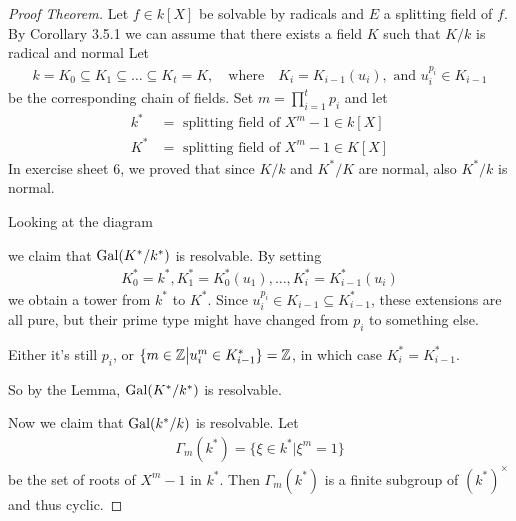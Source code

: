 \begin{proof}[Proof Theorem]
  Let $f \in k[X]$ be solvable by radicals and $E$ a splitting field of $f$.
  By Corollary 3.5.1 we can assume that there exists a field $K$ such that $K/k$ is radical and normal
  Let
  \begin{align*}
    k = K_0 \subseteq K_1 \subseteq \ldots \subseteq K_t = K, \quad \text{where} \quad K_i = K_{i-1}(u_i), \text{ and } u_i^{p_i} \in K_{i-1}
  \end{align*}
  be the corresponding chain of fields.
  Set $m = \prod_{i=1}^{t}p_{i}$
  and let
  \begin{align*}
    k^{\ast} &= \text{ splitting field of } X^{m} - 1 \in k[X]\\
    K^{\ast} &= \text{ splitting field of } X^{m} - 1 \in K[X]
  \end{align*}
  In exercise sheet 6, we proved that since $K/k$ and $K^{\ast}/K$ are normal, also $K^{\ast}/k$ is normal.

  Looking at the diagram
  \begin{center}
  \end{center}
  we claim that $\operatorname{Gal}(K^{\ast}/k^{\ast})$ is resolvable.
  By setting
  \begin{align*}
    K_0^{\ast} = k^{\ast}, K_1^{\ast}= K_0^{\ast}(u_1), \ldots, K_i^{\ast} = K_{i-1}^{\ast}(u_i)
  \end{align*}
  we obtain a tower from $k^{\ast}$ to $K^{\ast}$.
  Since $u_i^{p_i} \in K_{i-1} \subseteq K_{i-1}^{\ast}$, these extensions are all pure, but their prime type might have changed from $p_i$ to something else.

Either it's still $p_i$, or $\{m \in \mathbb{Z} \big\vert u_i^{m} \in K_{i-1}^{\ast}\} = \mathbb{Z}$, in which case $K_{i}^{\ast} = K_{i-1}^{\ast}$.

So by the Lemma, $\operatorname{Gal}(K^{\ast}/k^{\ast})$ is resolvable.

Now we claim that $\operatorname{Gal}(k^{\ast}/k)$ is resolvable.
Let
\begin{align*}
  \Gamma_m(k^{\ast}) = \{\xi \in k^{\ast} \big\vert \xi^{m} = 1\}
\end{align*}
be the set of roots of $X^{m} - 1$ in $k^{\ast}$.
Then $\Gamma_m(k^{\ast})$ is a finite subgroup of $(k^{\ast})^{\times}$ and thus cyclic.



\end{proof}
